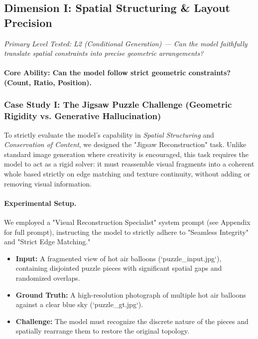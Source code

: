 \documentclass{llmxive}
\begin{document}
\subsection{Dimension I: Spatial Structuring \& Layout Precision}

\noindent\textit{Primary Level Tested: L2 (Conditional Generation) --- Can the model faithfully translate spatial constraints into precise geometric arrangements?}

\paragraph{Core Ability: Can the model follow strict geometric constraints? (Count, Ratio, Position).}

\subsubsection{Case Study I: The Jigsaw Puzzle Challenge (Geometric Rigidity vs. Generative Hallucination)}
\label{subsubsec:jigsaw_case}

To strictly evaluate the model's capability in \textit{Spatial Structuring} and \textit{Conservation of Content}, we designed the "Jigsaw Reconstruction" task. Unlike standard image generation where creativity is encouraged, this task requires the model to act as a rigid solver: it must reassemble visual fragments into a coherent whole based strictly on edge matching and texture continuity, without adding or removing visual information.

\paragraph{Experimental Setup.}
We employed a "Visual Reconstruction Specialist" system prompt (see Appendix for full prompt), instructing the model to strictly adhere to "Seamless Integrity" and "Strict Edge Matching."
\begin{itemize}
    \item \textbf{Input:} A fragmented view of hot air balloons (`puzzle\_input.jpg`), containing disjointed puzzle pieces with significant spatial gaps and randomized overlaps.
    \item \textbf{Ground Truth:} A high-resolution photograph of multiple hot air balloons against a clear blue sky (`puzzle\_gt.jpg`).
    \item \textbf{Challenge:} The model must recognize the discrete nature of the pieces and spatially rearrange them to restore the original topology.
\end{itemize}
\end{document}
